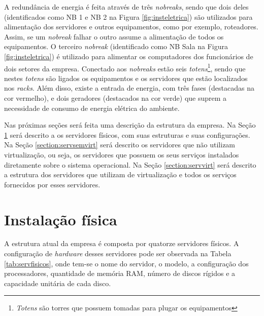 A redundância de energia é feita através de três \textit{nobreaks}, sendo que dois deles (identificados como NB 1 e NB 2 na Figura 
\ref{fig:insteletrica}) são utilizados para alimentação dos servidores e outros equipamentos, como por exemplo, roteadores. Assim, se um 
\textit{nobreak} falhar o outro assume a alimentação de todos os equipamentos. O terceiro \textit{nobreak} (identificado como NB Sala na Figura 
\ref{fig:insteletrica}) é utilizado para alimentar os computadores dos funcionários de dois setores da empresa. Conectado aos \textit{nobreaks} 
estão seis \textit{totens}\footnote[1]{\textit{Totens} são torres que possuem tomadas para plugar os equipamentos}, sendo que nestes \textit{totens} 
são ligados os equipamentos e os servidores que estão localizados nos \textit{racks}. Além disso, existe a entrada de energia, com três fases 
(destacadas na cor vermelho), e dois geradores (destacados na cor verde) que suprem a necessidade de consumo de energia elétrica do ambiente.

Nas próximas seções será feita uma descrição da estrutura da empresa. Na Seção \ref{section:fisico} será descrito a os servidores físicos, com 
suas estruturas e suas configurações. Na Seção \ref{section:servsemvirt} será descrito os servidores que não utilizam virtualização, ou seja, 
os servidores que possuem os seus serviços instalados diretamente sobre o sistema operacional. Na Seção \ref{section:servvirt} será descrito a 
estrutura dos servidores que utilizam de virtualização e todos os serviços fornecidos por esses servidores.

\section{Instalação física}
\label{section:fisico}

A estrutura atual da empresa é composta por quatorze servidores físicos. A configuração de \textit{hardware} desses servidores pode ser 
observada na Tabela \ref{tab:servfisicos}, onde tem-se o nome do servidor, o modelo, a configuração dos processadores, quantidade de memória
\ac{RAM}, número de discos rígidos e a capacidade unitária de cada disco.

